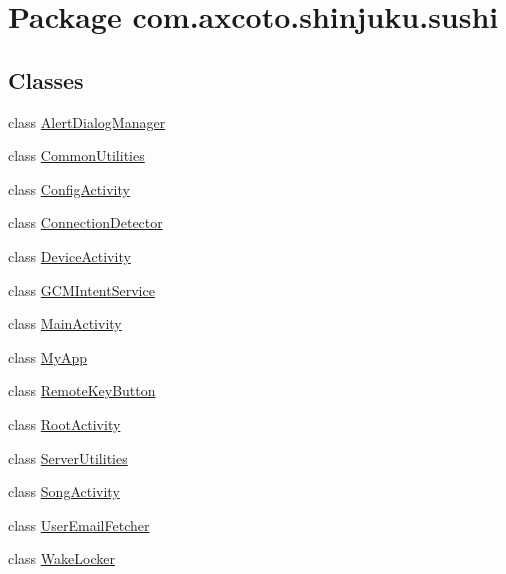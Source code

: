 \hypertarget{namespacecom_1_1axcoto_1_1shinjuku_1_1sushi}{\section{\-Package com.\-axcoto.\-shinjuku.\-sushi}
\label{namespacecom_1_1axcoto_1_1shinjuku_1_1sushi}
}
\subsection*{\-Classes}
\begin{DoxyCompactItemize}
\item 
class \hyperlink{classcom_1_1axcoto_1_1shinjuku_1_1sushi_1_1_alert_dialog_manager}{\-Alert\-Dialog\-Manager}
\item 
class \hyperlink{classcom_1_1axcoto_1_1shinjuku_1_1sushi_1_1_common_utilities}{\-Common\-Utilities}
\item 
class \hyperlink{classcom_1_1axcoto_1_1shinjuku_1_1sushi_1_1_config_activity}{\-Config\-Activity}
\item 
class \hyperlink{classcom_1_1axcoto_1_1shinjuku_1_1sushi_1_1_connection_detector}{\-Connection\-Detector}
\item 
class \hyperlink{classcom_1_1axcoto_1_1shinjuku_1_1sushi_1_1_device_activity}{\-Device\-Activity}
\item 
class \hyperlink{classcom_1_1axcoto_1_1shinjuku_1_1sushi_1_1_g_c_m_intent_service}{\-G\-C\-M\-Intent\-Service}
\item 
class \hyperlink{classcom_1_1axcoto_1_1shinjuku_1_1sushi_1_1_main_activity}{\-Main\-Activity}
\item 
class \hyperlink{classcom_1_1axcoto_1_1shinjuku_1_1sushi_1_1_my_app}{\-My\-App}
\item 
class \hyperlink{classcom_1_1axcoto_1_1shinjuku_1_1sushi_1_1_remote_key_button}{\-Remote\-Key\-Button}
\item 
class \hyperlink{classcom_1_1axcoto_1_1shinjuku_1_1sushi_1_1_root_activity}{\-Root\-Activity}
\item 
class \hyperlink{classcom_1_1axcoto_1_1shinjuku_1_1sushi_1_1_server_utilities}{\-Server\-Utilities}
\item 
class \hyperlink{classcom_1_1axcoto_1_1shinjuku_1_1sushi_1_1_song_activity}{\-Song\-Activity}
\item 
class \hyperlink{classcom_1_1axcoto_1_1shinjuku_1_1sushi_1_1_user_email_fetcher}{\-User\-Email\-Fetcher}
\item 
class \hyperlink{classcom_1_1axcoto_1_1shinjuku_1_1sushi_1_1_wake_locker}{\-Wake\-Locker}
\end{DoxyCompactItemize}
